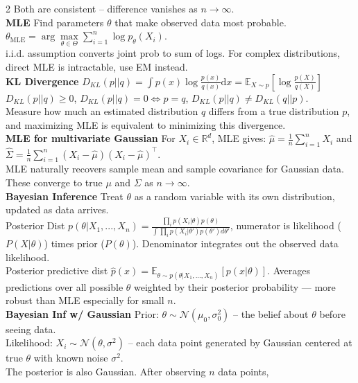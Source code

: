 \documentclass[10pt]{article}
\begin{document}
\begin{multicols*}{2}
Both are consistent -- difference vanishes as $n\to\infty$.\\
\textbf{MLE} Find parameters $\theta$ that make observed data most probable.\\
$\theta_{\text{MLE}} = \arg\max\limits_{\theta \in \Theta} \sum_{i=1}^n \log p_\theta(X_i)$.\\
i.i.d. assumption converts joint prob to sum of logs. For complex distributions, direct MLE is intractable, use EM instead.\\
\textbf{KL Divergence} $D_{KL}(p||q) = \int p(x)\log\frac{p(x)}{q(x)}\mathrm{d}x = \mathbb{E}_{X \sim p}[\log\frac{p(X)}{q(X)}]$\\
$D_{KL}(p||q) \geq 0$, $D_{KL}(p||q)=0 \iff p=q$, $D_{KL}(p||q)\neq D_{KL}(q||p)$.\\ 
Measure how much an estimated distribution $q$ differs from a true distribution $p$, and maximizing MLE is equivalent to minimizing this divergence.\\
\textbf{MLE for multivariate Gaussian} For $X_i\in\mathbb{R}^d$, MLE gives: $\hat{\mu} = \frac{1}{n}\sum_{i=1}^n X_i$ and $\hat{\Sigma} = \frac{1}{n}\sum_{i=1}^n (X_i - \hat{\mu})(X_i - \hat{\mu})^\top$.\\
MLE naturally recovers sample mean and sample covariance for Gaussian data. These converge to true $\mu$ and $\Sigma$ as $n \to \infty$.\\
\textbf{Bayesian Inference} Treat $\theta$ as a random variable with its own distribution, updated as data arrives.\\
Posterior Dist $p(\theta|X_1, ..., X_n) = \frac{\prod_i p(X_i|\theta)p(\theta)}{\int \prod_i p(X_i|\theta')p(\theta')d\theta'}$, numerator is likelihood ($P(X|\theta)$) times prior ($P(\theta)$). Denominator integrates out the observed data likelihood.\\
Posterior predictive dist $\hat{p}(x) = \mathbb{E}_{\theta \sim p(\theta|X_1, ..., X_n)}[p(x|\theta)]$. Averages predictions over all possible $\theta$ weighted by their posterior probability — more robust than MLE especially for small $n$.\\
\textbf{Bayesian Inf w/ Gaussian} Prior: $\theta \sim \mathcal{N}(\mu_0,\sigma_0^2)$ -- the belief about $\theta$ before seeing data.\\
Likelihood: $X_i\sim\mathcal{N}(\theta, \sigma^2)$ -- each data point generated by Gaussian centered at true $\theta$ with known noise $\sigma^2$.\\
The posterior is also Gaussian. After observing $n$ data points,

\end{multicols*}
\end{document}
